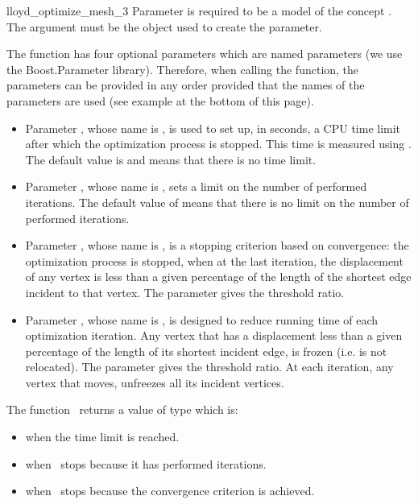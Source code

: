 \begin{ccRefFunction}{lloyd_optimize_mesh_3}
Parameter  is required to be a model of the concept
. The argument  must be the 
object used to create the  parameter.

The function has four optional parameters which are named parameters (we use the Boost.Parameter library). 
Therefore, when calling the function,  the parameters can be provided in any order 
provided that the names of the parameters are used
 (see example at the bottom of this page).
\begin{itemize}
\item
Parameter , whose name is ,
 is used to set up, in seconds,
 a CPU time limit after which the optimization process is stopped. This time is
 measured using .
The default value is  and means that there is no time limit.
\item  Parameter , whose name is 
 , sets a limit on the
number of performed  iterations. The default value of  means that there is 
no limit on the number of performed iterations.
\item  Parameter , whose name is 
 , is a stopping  criterion based on convergence: 
the optimization process is stopped, when at the last iteration,
the displacement of any vertex is less than a given percentage of the
length of the shortest  edge incident to that vertex.
The parameter  gives the threshold ratio.
\item
Parameter , whose name is ,
is designed to reduce running time of each optimization iteration. Any vertex 
that has
a displacement less than a given percentage of the length of its shortest incident edge,   is frozen (i.e. is
not relocated). The parameter  gives the threshold ratio. At each iteration, any vertex that
moves,  unfreezes all its incident vertices.
\end{itemize}

The function \ccRefName\ returns a value of type 
which is:
\begin{itemize}
\item {} when the time limit is reached.
\item {} when \ccRefName\ stops because it has performed  iterations.
\item {} when \ccRefName\ stops because the convergence criterion
is achieved.
\end{itemize}







\end{ccRefFunction}
